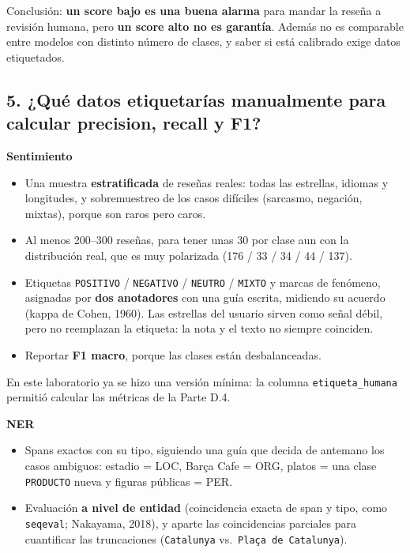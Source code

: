 \documentclass[12pt,a4paper]{article}
\begin{document}
Conclusión: \textbf{un score bajo es una buena alarma} para mandar la reseña a revisión humana, pero \textbf{un
score alto no es garantía}. Además no es comparable entre modelos con distinto número de clases, y
saber si está calibrado exige datos etiquetados.

\subsection{5. ¿Qué datos etiquetarías manualmente para calcular precision, recall y F1?}

\textbf{Sentimiento}

\begin{itemize}[leftmargin=1.2em]
\item
  Una muestra \textbf{estratificada} de reseñas reales: todas las estrellas, idiomas y longitudes, y
  sobremuestreo de los casos difíciles (sarcasmo, negación, mixtas), porque son raros pero caros.
\item
  Al menos 200--300 reseñas, para tener unas 30 por clase aun con la distribución real, que es muy
  polarizada (176 / 33 / 34 / 44 / 137).
\item
  Etiquetas \texttt{POSITIVO} / \texttt{NEGATIVO} / \texttt{NEUTRO} / \texttt{MIXTO} y marcas de fenómeno, asignadas por \textbf{dos
  anotadores} con una guía escrita, midiendo su acuerdo (kappa de Cohen, 1960). Las estrellas del usuario
  sirven como señal débil, pero no reemplazan la etiqueta: la nota y el texto no siempre coinciden.
\item
  Reportar \textbf{F1 macro}, porque las clases están desbalanceadas.
\end{itemize}

En este laboratorio ya se hizo una versión mínima: la columna \texttt{etiqueta\_humana} permitió calcular
las métricas de la Parte D.4.

\textbf{NER}

\begin{itemize}[leftmargin=1.2em]
\item
  Spans exactos con su tipo, siguiendo una guía que decida de antemano los casos ambiguos: estadio =
  LOC, Barça Cafe = ORG, platos = una clase \texttt{PRODUCTO} nueva y figuras públicas = PER.
\item
  Evaluación \textbf{a nivel de entidad} (coincidencia exacta de span y tipo, como \texttt{seqeval}; Nakayama, 2018), y aparte
  las coincidencias parciales para cuantificar las truncaciones (\texttt{Catalunya} vs.~\texttt{Plaça\ de\ Catalunya}).
\end{itemize}
\end{document}
